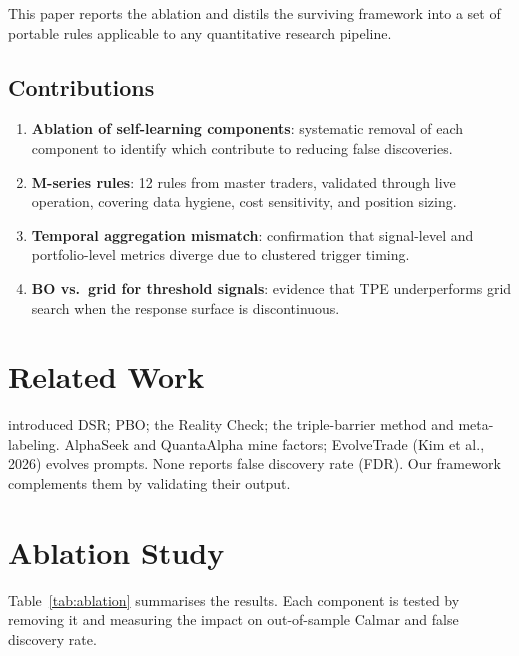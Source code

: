 \documentclass[11pt]{article}
\begin{document}
This paper reports the ablation and distils the surviving framework into a set of
portable rules applicable to any quantitative research pipeline.

\subsection{Contributions}
\begin{enumerate}
\item \textbf{Ablation of self-learning components}: systematic removal of each
  component to identify which contribute to reducing false discoveries.
\item \textbf{M-series rules}: 12 rules from master traders, validated through
  live operation, covering data hygiene, cost sensitivity, and position sizing.
\item \textbf{Temporal aggregation mismatch}: confirmation that signal-level
  and portfolio-level metrics diverge due to clustered trigger timing.
\item \textbf{BO vs.\ grid for threshold signals}: evidence that TPE
  underperforms grid search when the response surface is discontinuous.
\end{enumerate}

\section{Related Work}

\citet{dsr} introduced DSR; \citet{pbo} PBO; \citet{white2000} the Reality
Check; \citet{lopdeprado} the triple-barrier method and meta-labeling.
AlphaSeek \citep{alphaseek} and QuantaAlpha \citep{quantaalpha} mine factors;
EvolveTrade (Kim et al., 2026) evolves prompts. None reports false discovery
rate (FDR). Our framework complements them by validating their output.

\section{Ablation Study}
\label{sec:ablation}

Table~\ref{tab:ablation} summarises the results. Each component is tested by
removing it and measuring the impact on out-of-sample Calmar and false
discovery rate.
\end{document}
